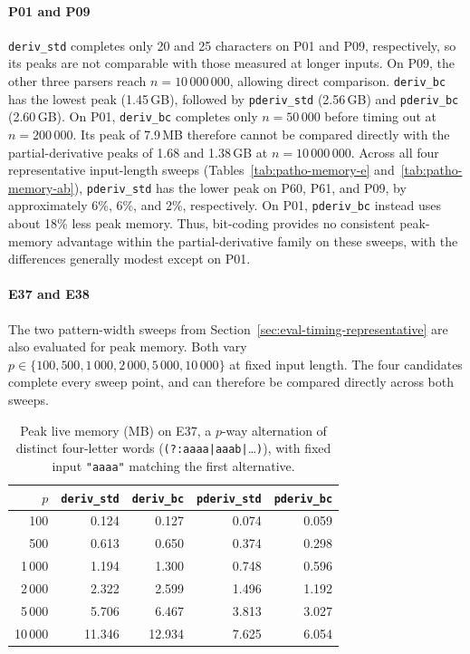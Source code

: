 %

\paragraph{P01 and P09}
\texttt{deriv\_std} completes only 20 and 25
characters on P01 and P09, respectively,
so its peaks are not comparable with those
measured at longer inputs.
On P09, the other three parsers reach
$n=10\,000\,000$, allowing direct comparison.
\texttt{deriv\_bc} has the lowest peak
(1.45\,GB), followed by \texttt{pderiv\_std}
(2.56\,GB) and \texttt{pderiv\_bc} (2.60\,GB).
On P01, \texttt{deriv\_bc} completes only
$n=50\,000$ before timing out at $n=200\,000$.
Its peak of 7.9\,MB therefore cannot be
compared directly with the partial-derivative
peaks of 1.68 and 1.38\,GB at $n=10\,000\,000$.
Across all four representative input-length
sweeps (Tables~\ref{tab:patho-memory-e}
and~\ref{tab:patho-memory-ab}),
\texttt{pderiv\_std} has the lower peak on
P60, P61, and P09, by approximately 6\%,
6\%, and 2\%, respectively.
On P01, \texttt{pderiv\_bc} instead uses
about 18\% less peak memory.
Thus, bit-coding provides no consistent
peak-memory advantage within the
partial-derivative family on these sweeps,
with the differences generally modest
except on P01.


%
%
%


\paragraph{E37 and E38}
The two pattern-width sweeps from
Section~\ref{sec:eval-timing-representative}
are also evaluated for peak memory.
Both vary $p \in \{100, 500, 1\,000,
2\,000, 5\,000, 10\,000\}$ at fixed input length.
The four candidates complete every sweep point,
and can therefore be
compared directly across both sweeps.

\begin{table}[H]
\centering
\small
\setlength{\tabcolsep}{4pt}
\begin{tabular*}{\textwidth}{@{\extracolsep{\fill}} r rrrr}
\hline
$p$ & \texttt{deriv\_std} & \texttt{deriv\_bc} & \texttt{pderiv\_std} & \texttt{pderiv\_bc} \\
\hline
100     &  0.124 &  0.127 &  0.074 &  0.059 \\
500     &  0.613 &  0.650 &  0.374 &  0.298 \\
1\,000  &  1.194 &  1.300 &  0.748 &  0.596 \\
2\,000  &  2.322 &  2.599 &  1.496 &  1.192 \\
5\,000  &  5.706 &  6.467 &  3.813 &  3.027 \\
10\,000 & 11.346 & 12.934 &  7.625 &  6.054 \\
\hline
\end{tabular*}
\caption{Peak live memory (MB) on E37, a $p$-way
alternation of distinct four-letter words
(\texttt{(?:aaaa|aaab|}\dots\texttt{)}),
with fixed input \texttt{"aaaa"} matching
the first alternative.}
\label{tab:patho-mem-e37}
\end{table}

